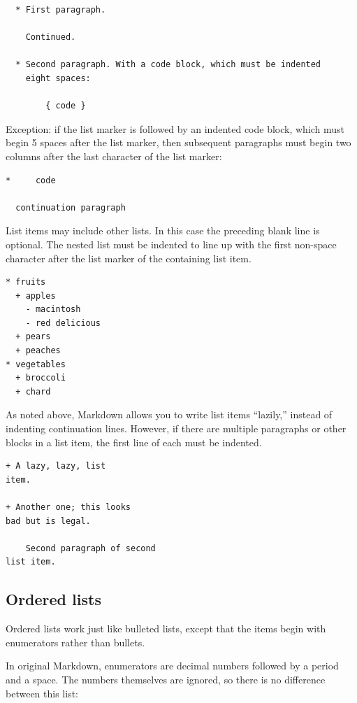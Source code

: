 \documentclass[
  b5paper
]{book}
\begin{document}
\begin{verbatim}
  * First paragraph.

    Continued.

  * Second paragraph. With a code block, which must be indented
    eight spaces:

        { code }
\end{verbatim}

Exception: if the list marker is followed by an indented code block,
which must begin 5 spaces after the list marker, then subsequent
paragraphs must begin two columns after the last character of the list
marker:

\begin{verbatim}
*     code

  continuation paragraph
\end{verbatim}

List items may include other lists. In this case the preceding blank
line is optional. The nested list must be indented to line up with the
first non-space character after the list marker of the containing list
item.

\begin{verbatim}
* fruits
  + apples
    - macintosh
    - red delicious
  + pears
  + peaches
* vegetables
  + broccoli
  + chard
\end{verbatim}

As noted above, Markdown allows you to write list items ``lazily,''
instead of indenting continuation lines. However, if there are multiple
paragraphs or other blocks in a list item, the first line of each must
be indented.

\begin{verbatim}
+ A lazy, lazy, list
item.

+ Another one; this looks
bad but is legal.

    Second paragraph of second
list item.
\end{verbatim}

\subsection{Ordered lists}\label{ordered-lists}

Ordered lists work just like bulleted lists, except that the items begin
with enumerators rather than bullets.

In original Markdown, enumerators are decimal numbers followed by a
period and a space. The numbers themselves are ignored, so there is no
difference between this list:
\end{document}
